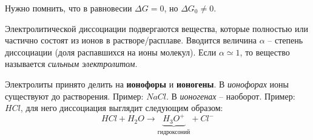 \begin{lecture}
\begin{lecSection}
	Нужно помнить, что в равновесии 
	$ \Delta G = 0 $, но $ \Delta G_0 \neq 0 $.
	\vspace{130pt}
		
	\end{lecSection}

	\begin{lecSection}
		Электролитической диссоциации подвергаются вещества, которые полностью или частично состоят из ионов в растворе/расплаве.
		Вводится величина $ \alpha $ -- степень диссоциации (доля распавшихся на ионы молекул).
		Если $ \alpha \simeq 1 $, то вещество называется \textit{сильным электролитом}.
		
		Электролиты принято делить на \textbf{ионофоры} и \textbf{ионогены}. В \textit{ионофорах} ионы существуют до растворения. Пример: $ NaCl $. В \textit{ионогенах} -- наоборот. Пример: $ HCl $, для него диссоциация выглядит следующим образом:
		\begin{equation}
			HCl + H_2O \rightarrow \underbrace{H_3 O^{+}}_{\text{гидроксоний}} + Cl^{-}
			\label{chem:HCl_dissociation}
		\end{equation}
	\end{lecSection}
	\vspace*{-5cm}
\end{lecture}
